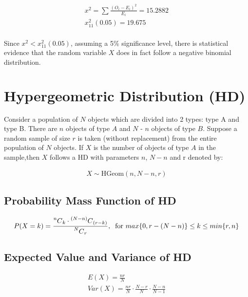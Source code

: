 \documentclass{article}
\newcommand\Mycomb[2][^n]{\prescript{#1\mkern-0.5mu}{}C_{#2}}
\begin{document}
\begin{gather*}
  x^2 = \sum \frac{(O_i - E_i)^2}{E_i} = 15.2882 \\[5pt]
  x^2_{11} (0.05) = 19.675 \\[5pt]
\end{gather*}

Since $ x^2 < x^2_{11}(0.05) $, assuming a 5\% significance level,
there is statistical evidence that
the random variable $ X $ does in fact follow a negative binomial
distribution.

\section{Hypergeometric Distribution (HD)}
Consider a population of $N$ objects which are divided into 2 types: type A and type B.
There are
$n$ objects of type $A$ and $N$ - $n$ objects of type $B$.
Suppose a random sample of size $r$ is taken
(without replacement) from the entire population of $N$ objects. If $X$ 
is the number of objects of
type $A$ in the sample,then $X$ follows a HD with parameters $n$, 
$N-n$ and r denoted by:

\begin{gather*}
  X \sim \text{HGeom}(n, N-n, r)
\end{gather*}

\subsection{Probability Mass Function of HD}

\begin{gather*}
  P(X=k) =  \frac{\Mycomb[n]{k} \cdot \Mycomb[(N-n)]{(r-k)}}
  {\Mycomb[N]{r}}, \; \;
  \text{for } max\{ 0, r - (N - n) \} \leq k \leq min\{r, n\}
\end{gather*}


\subsection{Expected Value and Variance of HD}
\begin{gather*}
  E(X) = \frac{nr}{N} \\[5pt]
  Var(X) = \frac{nr}{N} \cdot \frac{N -r}{N} \cdot \frac{N-n}{N-1}
\end{gather*}
\end{document}
